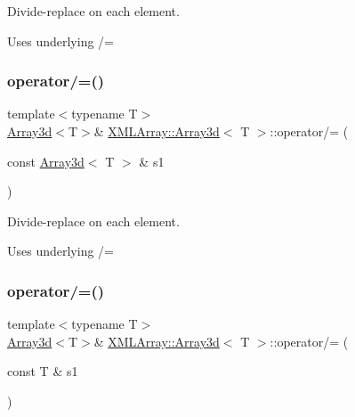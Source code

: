 Divide-\/replace on each element. 

Uses underlying /= \mbox{\label{classXMLArray_1_1Array3d_a67c611b25c5969b9b340959fde49f602}} 
\subsubsection{\texorpdfstring{operator/=()}{operator/=()}\hspace{0.1cm}{\footnotesize\ttfamily [2/4]}}
{\footnotesize\ttfamily template$<$typename T$>$ \\
\mbox{\hyperlink{classXMLArray_1_1Array3d}{Array3d}}$<$T$>$\& \mbox{\hyperlink{classXMLArray_1_1Array3d}{X\+M\+L\+Array\+::\+Array3d}}$<$ T $>$\+::operator/= (\begin{DoxyParamCaption}\item[{const \mbox{\hyperlink{classXMLArray_1_1Array3d}{Array3d}}$<$ T $>$ \&}]{s1 }\end{DoxyParamCaption})\hspace{0.3cm}{\ttfamily [inline]}}



Divide-\/replace on each element. 

Uses underlying /= \mbox{\label{classXMLArray_1_1Array3d_a28d7fb90e93469c69a1e0bd563967792}} 
\subsubsection{\texorpdfstring{operator/=()}{operator/=()}\hspace{0.1cm}{\footnotesize\ttfamily [3/4]}}
{\footnotesize\ttfamily template$<$typename T$>$ \\
\mbox{\hyperlink{classXMLArray_1_1Array3d}{Array3d}}$<$T$>$\& \mbox{\hyperlink{classXMLArray_1_1Array3d}{X\+M\+L\+Array\+::\+Array3d}}$<$ T $>$\+::operator/= (\begin{DoxyParamCaption}\item[{const T \&}]{s1 }\end{DoxyParamCaption})\hspace{0.3cm}{\ttfamily [inline]}}



